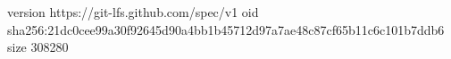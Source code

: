 version https://git-lfs.github.com/spec/v1
oid sha256:21dc0cee99a30f92645d90a4bb1b45712d97a7ae48c87cf65b11c6c101b7ddb6
size 308280
